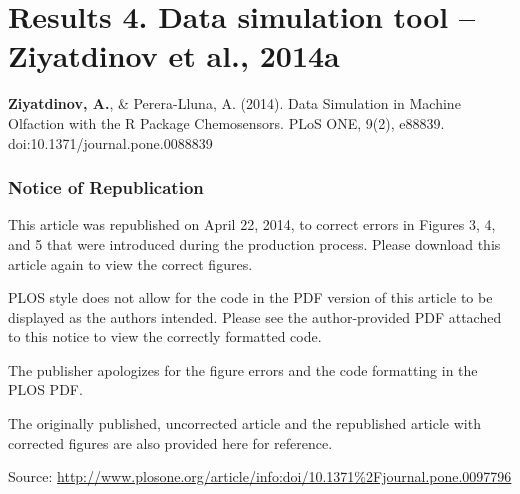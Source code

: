
\thispagestyle{empty}


\begingroup
\let\clearpage\relax
\let\cleardoublepage\relax
\let\cleardoublepage\relax

\vspace*{3cm}

  {
    \section{Results 4. Data simulation tool -- Ziyatdinov et al., 2014a}\label{pub4}
  }

\medskip

\noindent \textbf{Ziyatdinov, A.}, \& Perera-Lluna, A. (2014). 
Data Simulation in Machine Olfaction with the R Package Chemosensors. 
PLoS ONE, 9(2), e88839. doi:10.1371/journal.pone.0088839
\cite{Ziyatdinov2014}

\medskip

\subsubsection{Notice of Republication}

\medskip

\noindent This article was republished on April 22, 2014, to correct errors in Figures 3, 4, and 5 that were introduced during the production process. Please download this article again to view the correct figures.

\medskip

\noindent PLOS style does not allow for the code in the PDF version of this article to be displayed as the authors intended. Please see the author-provided PDF attached to this notice to view the correctly formatted code.

\medskip

\noindent The publisher apologizes for the figure errors and the code formatting in the PLOS PDF.

\medskip

\noindent The originally published, uncorrected article and the republished article with corrected figures are also provided here for reference.

\medskip

\medskip

\noindent Source: \href{http://www.plosone.org/article/info:doi/10.1371\%2Fjournal.pone.0097796}{http://www.plosone.org/article/info:doi/10.1371\%2Fjournal.pone.0097796}

\endgroup			

\vfill
